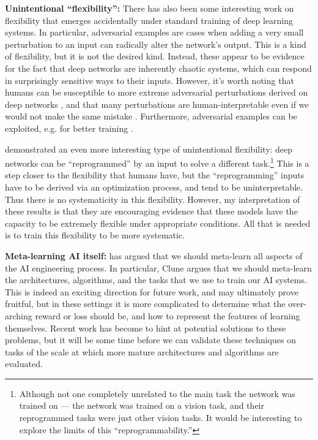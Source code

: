 \textbf{Unintentional ``flexibility'':} There has also been some interesting work on flexibility that emerges accidentally under standard training of deep learning systems. In particular, adversarial examples \citep{SzegedyAdv} are cases when adding a very small perturbation to an input can radically alter the network's output. This is a kind of flexibility, but it is not the desired kind. Instead, these appear to be evidence for the fact that deep networks are inherently chaotic systems, which can respond in surprisingly sensitive ways to their inputs. However, it's worth noting that humans can be susceptible to more extreme adversarial perturbations derived on deep networks \citep{Elsayed2018}, and that many perturbations are human-interpretable even if we would not make the same mistake \citep{Zhou2019}. Furthermore, adversarial examples can be exploited, e.g. for better training \citep{Goodfellow2015}. \par 
\citet{Elsayed} demonstrated an even more interesting type of unintentional flexibility: deep networks can be ``reprogrammed'' by an input to solve a different task.\footnote{Although not one completely unrelated to the main task the network was trained on --- the network was trained on a vision task, and their reprogrammed tasks were just other vision tasks. It would be interesting to explore the limits of this ``reprogrammability.''} This is a step closer to the flexibility that humans have, but the ``reprogramming'' inputs have to be derived via an optimization process, and tend to be uninterpretable. Thus there is no systematicity in this flexibility. However, my interpretation of these results is that they are encouraging evidence that these models have the capacity to be extremely flexible under appropriate conditions. All that is needed is to train this flexibility to be more systematic. \par  

\textbf{Meta-learning AI itself:} \citet{Clune2019} has argued that we should meta-learn all aspects of the AI engineering process. In particular, Clune argues that we should meta-learn the architectures, algorithms, and the tasks that we use to train our AI systems. This is indeed an exciting direction for future work, and may ultimately prove fruitful, but in these settings it is more complicated to determine what the over-arching reward or loss should be, and how to represent the features of learning themselves. Recent work has become to hint at potential solutions to these problems, but it will be some time before we can validate these techniques on tasks of the scale at which more mature architectures and algorithms are evaluated. \par 

